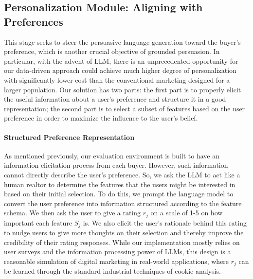 \subsection{Personalization Module: Aligning with Preferences}
\label{sec: user_preference-app}

This stage seeks to steer the persuasive language generation toward the buyer's preference, which is another crucial objective of grounded persuasion. In particular, with the advent of LLM, there is an unprecedented opportunity for our data-driven approach could achieve much higher degree of personalization with significantly lower cost than the conventional marketing designed for a larger population. Our solution has two parts: the first part is to properly elicit the useful information about a user's preference and structure it in a good representation; the second part is to select a subset of features based on the user preference in order to maximize the influence to the user's belief. 

\paragraph{Structured Preference Representation}
As mentioned previously, our evaluation environment is built to have an information elicitation process from each buyer. However, such information cannot directly describe the user's preference. 
So, we ask the LLM to act like a human realtor to determine the features that the users might be interested in based on their initial selection.
To do this, we prompt the language model to convert the user preference into information structured according to the feature schema. 
We then ask the user to give a rating $r_j$ on a scale of 1-5 on how important each feature $S_j$ is. We also elicit the user's rationale behind this rating to nudge users to give more thoughts on their selection and thereby improve the credibility of their rating responses. While our implementation mostly relies on user surveys and the information processing power of LLMs, this design is a reasonable simulation of digital marketing in real-world applications, where $r_j$ can be learned through the standard industrial techniques of cookie analysis.

